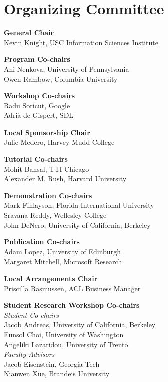 \markboth{}{} %
\markright{}{} %

\section{Organizing Committee}{}

\setlength{\parindent}{0pt}

{\bf General Chair} \\
Kevin Knight, USC Information Sciences Institute

{\bf Program Co-chairs} \\
Ani Nenkova, University of Pennsylvania \\
Owen Rambow, Columbia University

{\bf Workshop Co-chairs} \\
Radu Soricut, Google \\
Adri\`{a} de Gispert, SDL

{\bf Local Sponsorship Chair} \\
Julie Medero, Harvey Mudd College

{\bf Tutorial Co-chairs} \\
Mohit Bansal, TTI Chicago \\
Alexander M. Rush, Harvard University

{\bf Demonstration Co-chairs} \\
Mark Finlayson, Florida International University\\
Sravana Reddy, Wellesley College\\
John DeNero, University of California, Berkeley

{\bf Publication Co-chairs} \\
Adam Lopez, University of Edinburgh\\
Margaret Mitchell, Microsoft Research

{\bf Local Arrangements Chair} \\
Priscilla Rasmussen, ACL Business Manager

{\bf Student Research Workshop Co-chairs} \\
\indent \emph{Student Co-chairs} \\
\hspace*{0.2in} Jacob Andreas, University of California, Berkeley \\
\hspace*{0.2in} Eunsol Choi, University of Washington \\
\hspace*{0.2in} Angeliki Lazaridou, University of Trento\\
\emph{Faculty Advisors} \\
\hspace*{0.2in} Jacob Eisenstein, Georgia Tech \\
\hspace*{0.2in} Nianwen Xue, Brandeis University

